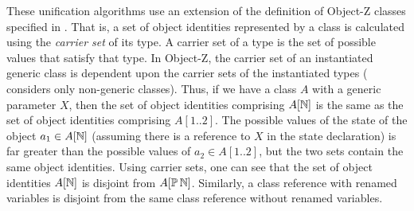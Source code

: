 These unification algorithms use an extension of the definition of
Object-Z classes specified in \cite{griffiths94}. That is, a set of
object identities represented by a class is calculated using the {\em
carrier set} of its type. A carrier set of a type is the set of
possible values that satisfy that type. In Object-Z, the carrier set
of an instantiated generic class is dependent upon the carrier sets of
the instantiated types (\cite{griffiths94} considers only non-generic
classes). Thus, if we have a class $A$ with a generic parameter $X$,
then the set of object identities comprising $A[{\mathbb N}]$ is the same as
the set of object identities comprising $A[1..2]$. The possible values
of the state of the object $a_1 \in A[{\mathbb N}]$ (assuming there is a
reference to $X$ in the state declaration) is far greater than the
possible values of $a_2 \in A[1..2]$, but the two sets contain the
same object identities. Using carrier sets, one can see that the set
of object identities $A[{\mathbb N}]$ is disjoint from $A[\power
\nat]$. Similarly, a class reference with renamed variables is
disjoint from the same class reference without renamed variables.
